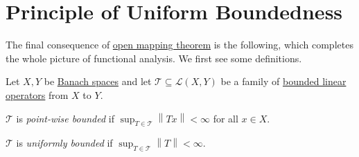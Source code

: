 \section{Principle of Uniform Boundedness}
The final consequence of \hyperref[thm:open-mapping]{open mapping theorem} is the following, which completes the whole picture of functional analysis. We first see some definitions.

\begin{definition*}
	Let \(X, Y\) be \hyperref[def:Banach-space]{Banach spaces} and let \(\mathcal{T} \subseteq \mathcal{L} (X, Y)\) be a family of \hyperref[def:bounded-linear-op]{bounded linear operators} from \(X\) to \(Y\).
	\begin{definition}\label{def:point-wise-bounded}
		\(\mathcal{T} \) is \emph{point-wise bounded} if \(\sup _{T\in \mathcal{T} } \left\lVert Tx\right\rVert < \infty\) for all \(x\in X\).
	\end{definition}
	\begin{definition}\label{def:uniformly-bounded}
		\(\mathcal{T} \) is \emph{uniformly bounded} if \(\sup _{T\in \mathcal{T} }\left\lVert T\right\rVert < \infty \).
	\end{definition}
\end{definition*}

